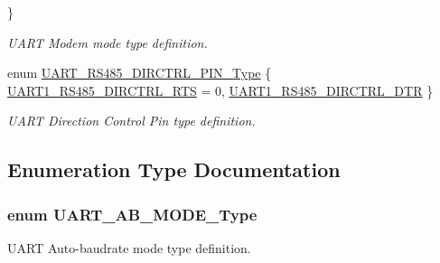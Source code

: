\begin{DoxyCompactItemize}
 \}
\begin{DoxyCompactList}\small\item\em \-U\-A\-R\-T \-Modem mode type definition. \end{DoxyCompactList}\item 
enum \hyperlink{group___u_a_r_t___public___types_gabcfaaf12f325112107ff9b5c5cf1120c}{\-U\-A\-R\-T\-\_\-\-R\-S485\-\_\-\-D\-I\-R\-C\-T\-R\-L\-\_\-\-P\-I\-N\-\_\-\-Type} \{ \hyperlink{group___u_a_r_t___public___types_ggabcfaaf12f325112107ff9b5c5cf1120ca8f2c8ec98f2fb7e26516974a08fc2885}{\-U\-A\-R\-T1\-\_\-\-R\-S485\-\_\-\-D\-I\-R\-C\-T\-R\-L\-\_\-\-R\-T\-S} =  0, 
\hyperlink{group___u_a_r_t___public___types_ggabcfaaf12f325112107ff9b5c5cf1120cad58cd4cd834d89b139816c0cd3138582}{\-U\-A\-R\-T1\-\_\-\-R\-S485\-\_\-\-D\-I\-R\-C\-T\-R\-L\-\_\-\-D\-T\-R}
 \}
\begin{DoxyCompactList}\small\item\em \-U\-A\-R\-T \-Direction \-Control \-Pin type definition. \end{DoxyCompactList}\end{DoxyCompactItemize}


\subsection{\-Enumeration \-Type \-Documentation}
\hypertarget{group___u_a_r_t___public___types_ga0a6689108a4f3651d2188ea8a2c17d4a}{
\subsubsection[{\-U\-A\-R\-T\-\_\-\-A\-B\-\_\-\-M\-O\-D\-E\-\_\-\-Type}]{\setlength{\rightskip}{0pt plus 5cm}enum {\bf \-U\-A\-R\-T\-\_\-\-A\-B\-\_\-\-M\-O\-D\-E\-\_\-\-Type}}}\label{group___u_a_r_t___public___types_ga0a6689108a4f3651d2188ea8a2c17d4a}


\-U\-A\-R\-T \-Auto-\/baudrate mode type definition. 

